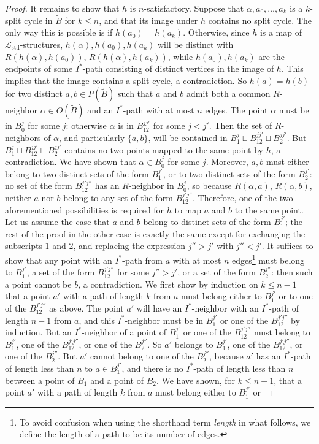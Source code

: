 \documentclass{amsart}
\theoremstyle{definition}
\theoremstyle{remark}
\numberwithin{equation}{section}
\begin{document}
\begin{proof}
 It remains to show that $h$ is $n$-satisfactory. Suppose that $\alpha, a_{0}, \ldots, a_k$ is a $k$-split cycle in $\tilde{B}$ for $k \leq n$, and that its image under $h$ contains no split cycle. The only way this is possible is if $h(a_0)=h(a_k)$. Otherwise, since $h$ is a map of $\mathcal{L}_{\mathrm{std}}$-structures, $h(\alpha), h(a_{0}), h(a_{k})$ will be distinct with $R(h(\alpha), h(a_0))$, $R(h(\alpha), h(a_k))$, while $h(a_{0}), h(a_k)$ are the endpoints of some $I^{*}$-path consisting of distinct vertices in the image of $h$.  This implies that the image contains a split cycle, a contradiction. So $h(a) = h(b)$ for two distinct $a, b \in P(\tilde{B})$ such that $a$ and $b$ admit both a common $R$-neighbor $\alpha \in O(\tilde{B})$ and an $I^{*}$-path with at most $n$ edges. The point $\alpha$ must be in $B^{j}_{0}$ for some $j$: otherwise $\alpha$ is in $B^{jj'}_{12}$ for some $j < j'$. Then the set of $R$-neighbors of $\alpha$, and particularly $\{a, b\}$, will be contained in $B^{j}_{1}  \sqcup B^{jj'}_{12} \sqcup B_{2}^{jj'}$. But $B^{j}_{1}  \sqcup B^{jj'}_{12} \sqcup B_{2}^{jj'}$ contains no two points mapped to the same point by $h$, a contradiction. We have shown that $\alpha \in B^{j}_{0}$ for some $j$. Moreover,  $a, b$ must either belong to two distinct sets of the form $B_{1}^{j'}$, or to two distinct sets of the form $B_{2}^{j'}$: no set of the form $B^{j'j''}_{12}$ has an $R$-neighbor in $B^{j}_{0}$, so because $R(\alpha, a)$, $R(\alpha, b)$, neither $a$ nor $b$ belong to any set of the form $B^{j'j''}_{12}$. Therefore,  one of the two aforementioned possibilities is required for $h$ to map $a$ and $b$ to the same point. Let us assume the case that $a$ and $b$ belong to distinct sets of the form $B_{1}^{j'}$; the rest of the proof in the other case is exactly the same except for exchanging the subscripts $1$ and $2$, and replacing the expression $j''> j'$ with $j'' < j'$. It suffices to show that any point with an $I^{*}$-path from $a$ with at most $n$ edges\footnote{To avoid confusion when using the shorthand term \textit{length} in what follows, we define the length of a path to be its number of edges.}  must belong to $B_{1}^{j'}$, a set of the form $B_{12}^{j'j''}$ for some $j'' >j'$, or a set of the form $B^{j''}_{2}$: then such a point cannot be $b$, a contradiction. We first show by induction on $k \leq n-1$ that a point $a'$ with a path of length $k$ from $a$ must belong either to $B_{1}^{j'}$ or to one of the $B_{12}^{j'j''}$ as above. The point $a'$ will have an $I^{*}$-neighbor with an $I^{*}$-path of length $n-1$ from $a$, and this $I^{*}$-neighbor must be in $B_{1}^{j'}$ or one of the $B_{12}^{j'j''}$ by induction. But an $I^{*}$-neighbor of a point of $B_{1}^{j'}$ or one of the $B_{12}^{j'j''}$ must belong to $B_{1}^{j'}$, one of the $B_{12}^{j'j''}$, or one of the $B^{j''}_{2}$. So $a'$ belongs to $B_{1}^{j'}$, one of the $B_{12}^{j'j''}$, or one of the $B^{j''}_{2}$. But $a'$ cannot belong to one of the $B^{j''}_{2}$, because $a'$ has an $I^{*}$-path of length less than $n$ to $a \in B^{j'}_{1}$, and there is no $I^{*}$-path of length less than $n$ between a point of $B_{1}$ and a point of $B_{2}$. We have shown, for  $k \leq n-1$, that a point $a'$ with a path of length $k$ from $a$ must belong either to $B_{1}^{j'}$ or 
\end{proof}
\end{document}
